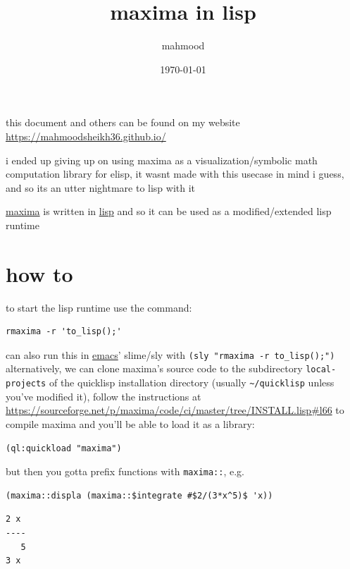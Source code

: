 \documentclass[a4paper,12pt]{article}
\author{mahmood}
\date{\today}
\title{maxima in lisp}
\begin{document}
\maketitle
\begin{note}
this document and others can be found on my website\\
\url{https://mahmoodsheikh36.github.io/}
\end{note}
\begin{note}
i ended up giving up on using maxima as a visualization/symbolic math computation library for elisp, it wasnt made with this usecase in mind i guess, and so its an utter nightmare to lisp with it\\
\end{note}
\href{20230510181855-maxima.org}{maxima} is written in \href{20230215220838-lisp.org}{lisp} and so it can be used as a modified/extended lisp runtime\\
\section{how to}
\label{sec:org062e185}
to start the lisp runtime use the command:\\
\lstset{language=bash,label= ,caption= ,captionpos=b,numbers=none}
\begin{lstlisting}
rmaxima -r 'to_lisp();'
\end{lstlisting}
can also run this in \href{emacs.org}{emacs}' slime/sly with \texttt{(sly "rmaxima -r to\_lisp();")}\\
alternatively, we can clone maxima's source code to the subdirectory \texttt{local-projects} of the quicklisp installation directory (usually \texttt{\textasciitilde{}/quicklisp} unless you've modified it), follow the instructions at \url{https://sourceforge.net/p/maxima/code/ci/master/tree/INSTALL.lisp\#l66} to compile maxima and you'll be able to load it as a library:\\
\lstset{language=Lisp,label= ,caption= ,captionpos=b,numbers=none}
\begin{lstlisting}
(ql:quickload "maxima")
\end{lstlisting}
but then you gotta prefix functions with \texttt{maxima::}, e.g.\\
\lstset{language=Lisp,label= ,caption= ,captionpos=b,numbers=none}
\begin{lstlisting}
(maxima::displa (maxima::$integrate #$2/(3*x^5)$ 'x))
\end{lstlisting}

\begin{verbatim}
2 x
----
   5
3 x
\end{verbatim}
\end{document}
